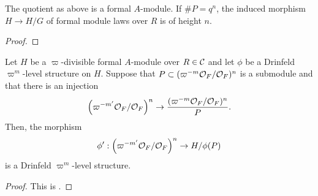 \documentclass[../main.tex]{subfiles}
\begin{document}
\begin{lem}\label{lem:PropertyOfQuotient}
  The quotient as above is a formal $A$-module. If $\# P = q^n$, the induced
  morphism $H \to H/G$ of formal module laws over $R$ is of height $n$.
\begin{proof}
\end{proof}
\end{lem}

\begin{lem}\label{lem:DrinfeldLevelOnQuotients}
  Let $H$ be a $\varpi$-divisible formal $A$-module over $R\in\mathcal{C}$ and let 
  $\phi$ be a Drinfeld $\varpi^m$-level structure on $H$. Suppose that 
  $P \subset (\varpi^{-m} \mathcal{O}_F/\mathcal{O}_F)^n$ is a submodule and that 
  there is an injection 
  \begin{equation*}
    \left(\varpi^{-m'} \mathcal{O}_F/\mathcal{O}_F \right)^n \to \frac{(\varpi^{-m}
    \mathcal{O}_F/\mathcal{O}_F)^n}{P}.
  \end{equation*}
  Then, the morphism
  \begin{equation*}
    \phi': \left(\varpi^{-m'} \mathcal{O}_F/\mathcal{O}_F \right)^n \to H/\phi(P)
  \end{equation*}
  is a Drinfeld $\varpi^m$-level structure.
\begin{proof}
  This is \cite[Proposition 4.4]{drinfel1974elliptic}.
\end{proof}
\end{lem}
\end{document}
